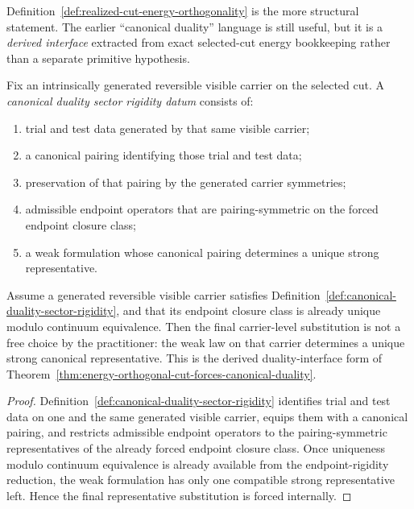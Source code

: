 \begin{remark}
\label{rem:canonical-duality-derived}
Definition~\ref{def:realized-cut-energy-orthogonality} is the more structural
statement. The earlier ``canonical duality'' language is still useful, but it
is a \emph{derived interface} extracted from exact selected-cut energy
bookkeeping rather than a separate primitive hypothesis.
\end{remark}

\begin{definition}
\label{def:canonical-duality-sector-rigidity}
Fix an intrinsically generated reversible visible carrier on the selected cut.
A \emph{canonical duality sector rigidity datum} consists of:
\begin{enumerate}[label=(\roman*), leftmargin=2em, itemsep=0.2em]
\item trial and test data generated by that same visible carrier;
\item a canonical pairing identifying those trial and test data;
\item preservation of that pairing by the generated carrier symmetries;
\item admissible endpoint operators that are pairing-symmetric on the forced
      endpoint closure class;
\item a weak formulation whose canonical pairing determines a unique strong
      representative.
\end{enumerate}
\end{definition}

\begin{theorem}
\label{thm:canonical-duality-forces-endpoint-substitution}
Assume a generated reversible visible carrier satisfies
Definition~\ref{def:canonical-duality-sector-rigidity}, and that its endpoint
closure class is already unique modulo continuum equivalence. Then the final
carrier-level substitution is not a free choice by the practitioner: the weak
law on that carrier determines a unique strong canonical representative. This
is the derived duality-interface form of
Theorem~\ref{thm:energy-orthogonal-cut-forces-canonical-duality}.
\end{theorem}

\begin{proof}
Definition~\ref{def:canonical-duality-sector-rigidity} identifies trial and
test data on one and the same generated visible carrier, equips them with a
canonical pairing, and restricts admissible endpoint operators to the
pairing-symmetric representatives of the already forced endpoint closure
class. Once uniqueness modulo continuum equivalence is already available from
the endpoint-rigidity reduction, the weak formulation has only one compatible
strong representative left. Hence the final representative substitution is
forced internally.
\end{proof}

